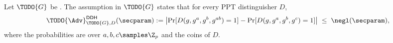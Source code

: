 \begin{definition}
\label{def:\TODO{assumption-label}}
Let $\TODO{G}$ be .
The \emph{} assumption in $\TODO{G}$
states that for every PPT distinguisher $D$,
\[
  \TODO{\Adv}^{\textsf{DDH}}_{\TODO{G}, D}(\secparam)
  := \left| \Pr[D(g, g^a, g^b, g^{ab}) = 1] - \Pr[D(g, g^a, g^b, g^c) = 1] \right|
  \;\leq\; \negl(\secparam),
\]
where the probabilities are over $a, b, c \samples \Z_p$ and the coins of $D$.

\end{definition}
